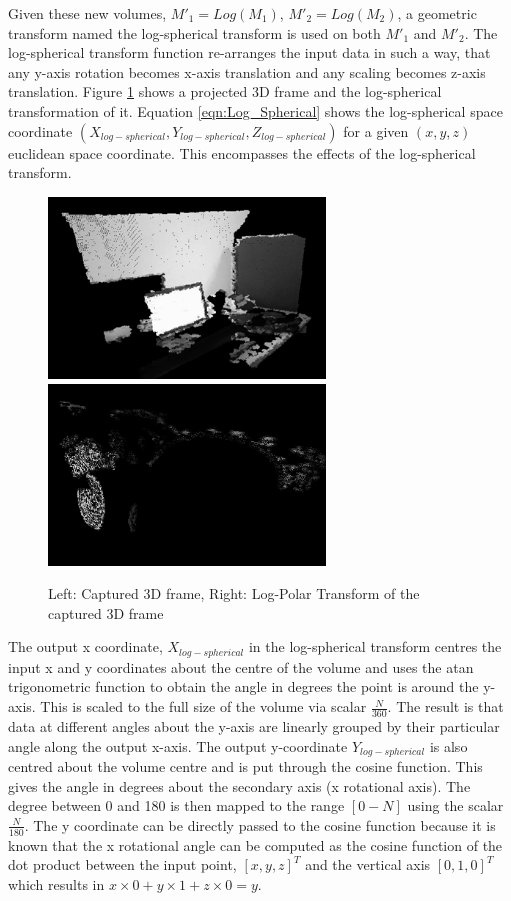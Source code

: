 Given these new volumes, $M'_1 = Log(M_1)$, $M'_2 = Log(M_2)$, a geometric transform named the log-spherical transform is used on both $M'_1$ and $M'_2$. The log-spherical transform function re-arranges the input data in such a way, that any y-axis rotation becomes x-axis translation and any scaling becomes z-axis translation. Figure \ref{fig:LogPolarTransform3DExample} shows a projected 3D frame and the log-spherical transformation of it. Equation \ref{eqn:Log_Spherical} shows the log-spherical space coordinate $(X_{log-spherical}, Y_{log-spherical}, Z_{log-spherical})$ for a given $(x,y,z)$ euclidean space coordinate. This encompasses the effects of the log-spherical transform. \\

\begin{figure}[!htb]
\centering
\includegraphics[width=2.9in]{images/methodology/FVR/capFrameA}
\includegraphics[width=2.9in]{images/methodology/FVR/capFrameLogPolar}
\caption{Left: Captured 3D frame, Right: Log-Polar Transform of the captured 3D frame}
\label{fig:LogPolarTransform3DExample}
\end{figure}

The output x coordinate, $X_{log-spherical}$ in the log-spherical transform centres the input x and y coordinates about the centre of the volume and uses the atan trigonometric function to obtain the angle in degrees the point is around the y-axis. This is scaled to the full size of the volume via scalar $\frac{N}{360}$. The result is that data at different angles about the y-axis are linearly grouped by their particular angle along the output x-axis. The output y-coordinate $Y_{log-spherical}$ is also centred about the volume centre and is put through the cosine function. This gives the angle in degrees about the secondary axis (x rotational axis). The degree between 0 and 180 is then mapped to the range $[0-N]$ using the scalar $\frac{N}{180}$. The y coordinate can be directly passed to the cosine function because it is known that the x rotational angle can be computed as the cosine function of the dot product between the input point, $[x,y,z]^T$ and the vertical axis $[0,1,0]^T$ which results in $x \times 0 + y \times 1 + z \times 0 = y$. \\


